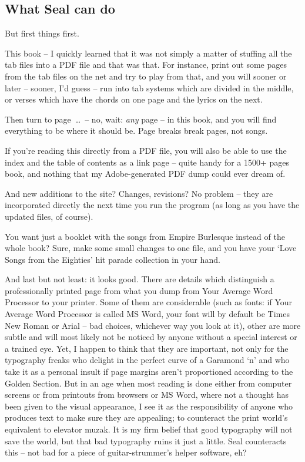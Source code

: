 \subsection*{What Seal can do}

But first things first.
 
This book -- I quickly learned that it was not simply a matter of
stuffing all the tab files into a PDF file and that was that. For
instance, print out some pages from the tab files on the net and try
to play from that, and you will sooner or later -- sooner, I'd guess
-- run into tab systems which are divided in the middle, or verses
which have the chords on one page and the lyrics on the next.
 
Then turn to page~\ldots{}~-- no, wait: \emph{any }page -- in this
book, and you will find everything to be where it should be. Page
breaks break pages, not songs.
 
If you're reading this directly from a PDF file, you will also be able
to use the index and the table of contents as a link page -- quite
handy for a 1500+ pages book, and nothing that my Adobe-generated PDF
dump could ever dream of.
 
And new additions to the site? Changes, revisions? No problem -- they
are incorporated directly the next time you run the program (as long
as you have the updated files, of course).
 
You want just a booklet with the songs from Empire Burlesque instead
of the whole book? Sure, make some small changes to one file, and you
have your `Love Songs from the Eighties' hit parade collection
in your hand.
 
And last but not least: it looks good. There are details which
distinguish a professionally printed page from what you dump from Your
Average Word Processor to your printer. Some of them are considerable
(such as fonts: if Your Average Word Processor is called MS Word, your
font will by default be Times New Roman or Arial -- bad choices,
whichever way you look at it), other are more subtle and will most
likely not be noticed by anyone without a special interest or a
trained eye. Yet, I happen to think that they are important, not only
for the typography freaks who delight in the perfect curve of a
Garamond `n' and who take it as a personal insult if page
margins aren't proportioned according to the Golden Section. But in an
age when most reading is done either from computer screens or from
printouts from browsers or \textsc{MS} Word, where not a thought has been given
to the visual appearance, I see it as the responsibility of anyone who
produces text to make sure they are appealing; to counteract the print
world's equivalent to elevator muzak. It is my firm belief that good
typography will not save the world, but that bad typography ruins it
just a little. Seal counteracts this -- not bad for a piece of
guitar-strummer's helper software, eh?
 
